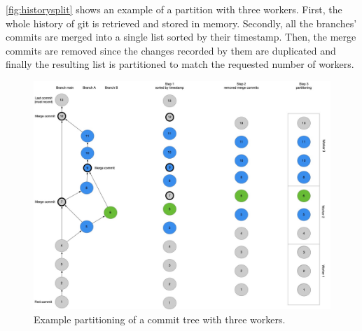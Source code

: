 \autoref{fig:historysplit} shows an example of a partition with three workers. First, the whole history of git is retrieved and stored in memory. Secondly, all the branches' commits are merged into a single list sorted by their timestamp. 
Then, the merge commits are removed since the changes recorded by them are duplicated and finally the resulting list is partitioned to match the requested number of workers. 
\begin{figure}
    \center
    \includegraphics[width=\textwidth]{HistorySplit.jpg}
    \caption{Example partitioning of a commit tree with three workers.}
    \label{fig:historysplit}
\end{figure}


